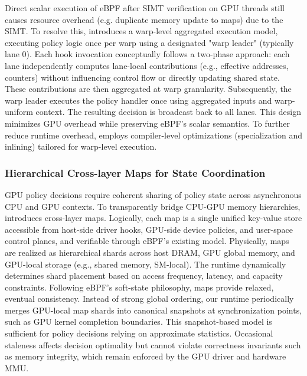 Direct scalar execution of eBPF after SIMT verification on GPU threads still causes resource overhead (e.g. duplicate memory update to maps) due to the SIMT. To resolve this, \sys introduces a warp-level aggregated execution model, executing policy logic once per warp using a designated "warp leader" (typically lane 0). Each hook invocation conceptually follows a two-phase approach: each lane independently computes lane-local contributions (e.g., effective addresses, counters) without influencing control flow or directly updating shared state. These contributions are then aggregated at warp granularity. Subsequently, the warp leader executes the policy handler once using aggregated inputs and warp-uniform context. The resulting decision is broadcast back to all lanes. This design minimizes GPU overhead while preserving eBPF's scalar semantics. To further reduce runtime overhead, \sys employs compiler-level optimizations (specialization and inlining) tailored for warp-level execution.

\subsubsection{Hierarchical Cross-layer Maps for State Coordination}

GPU policy decisions require coherent sharing of policy state across asynchronous CPU and GPU contexts. To transparently bridge CPU-GPU memory hierarchies, \sys introduces cross-layer maps. Logically, each map is a single unified key-value store accessible from host-side driver hooks, GPU-side device policies, and user-space control planes, and verifiable through eBPF's existing model. Physically, maps are realized as hierarchical shards across host DRAM, GPU global memory, and GPU-local storage (e.g., shared memory, SM-local). The runtime dynamically determines shard placement based on access frequency, latency, and capacity constraints. Following eBPF's soft-state philosophy, \sys maps provide relaxed, eventual consistency. Instead of strong global ordering, our runtime periodically merges GPU-local map shards into canonical snapshots at synchronization points, such as GPU kernel completion boundaries. This snapshot-based model is sufficient for policy decisions relying on approximate statistics. Occasional staleness affects decision optimality but cannot violate correctness invariants such as memory integrity, which remain enforced by the GPU driver and hardware MMU.
